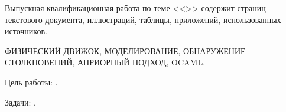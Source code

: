
Выпускная квалификационная работа по теме <<\Topic>> содержит
\pageref{LastPage} страниц текстового документа,
\TODO иллюстраций,
\TODO таблицы,
\TODO приложений,
 использованных источников.

\MakeUppercase{
    физический движок,
    моделирование,
    обнаружение столкновений,
    априорный подход,
    OCaml.
}

Цель работы: \TODO.

Задачи: \TODO.

\TODO
